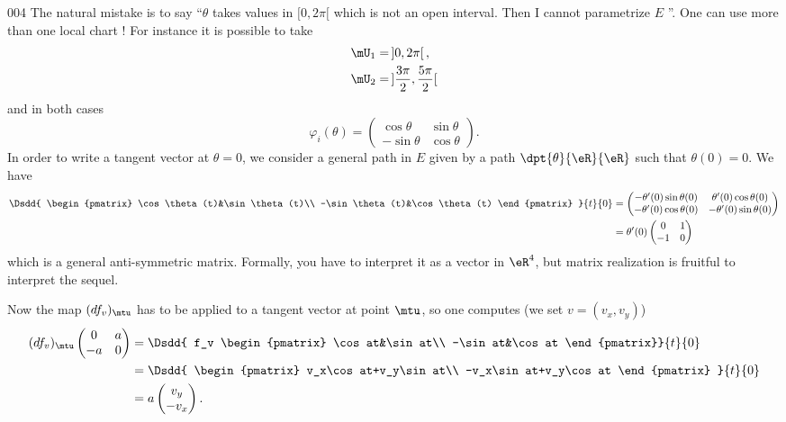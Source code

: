 \begin{corrige}{004}
The natural mistake is to say ``$\theta$ takes values in $[0,2\pi[$ which is not an open interval. Then I cannot parametrize $E$ ''. One can use more than one local chart ! For instance it is possible to take
\[ 
\begin{aligned}
  \mU_1&=\,]0,2\pi[\,,\\
  \mU_2&=\,]\frac{ 3\pi }{ 2 }, \frac{ 5\pi }{ 2 }[
\end{aligned}
\]
and in both cases
\[ 
  \varphi_i(\theta)=
\begin{pmatrix}
\cos\theta&\sin\theta\\
-\sin\theta&\cos\theta
\end{pmatrix}.
\]
In order to write a tangent vector at $\theta=0$, we consider a general path in $E$ given by a path $\dpt{ \theta }{ \eR }{ \eR }$ such that $\theta(0)=0$. We have
\begin{equation}
\begin{split}
\Dsdd{ 
\begin{pmatrix}
\cos\theta(t)&\sin\theta(t)\\
-\sin\theta(t)&\cos\theta(t)
\end{pmatrix}
 }{t}{0}
&=
\begin{pmatrix}
-\theta'(0)\sin\theta(0)&\theta'(0)\cos\theta(0)\\
-\theta'(0)\cos\theta(0)&-\theta'(0)\sin\theta(0)
\end{pmatrix}\\
&=
\theta'(0)
\begin{pmatrix}
0&1\\-1&0
\end{pmatrix}
\end{split}
\end{equation}
which is a general anti-symmetric matrix. Formally, you have to interpret it as a vector in $\eR^4$, but matrix realization is fruitful to interpret the sequel.

Now the map $(df_v)_{\mtu}$ has to be applied to a tangent vector at point $\mtu$, so one computes (we set $v=(v_x,v_y)$)
\begin{equation}
\begin{split}
   (df_v)_{\mtu}
\begin{pmatrix}
0&a\\-a&0
\end{pmatrix}
&=
\Dsdd{ f_v
\begin{pmatrix}
\cos at&\sin at\\
-\sin at&\cos at
\end{pmatrix}}{t}{0}\\
&=\Dsdd{ 
\begin{pmatrix}
  v_x\cos at+v_y\sin at\\
-v_x\sin at+v_y\cos at
\end{pmatrix}
  }{t}{0}\\
&=a
\begin{pmatrix}
v_y\\-v_x
\end{pmatrix}.
\end{split}
\end{equation}
 

\end{corrige}
